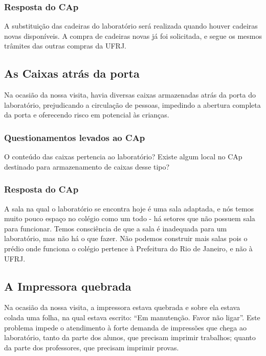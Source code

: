 \subsubsection{Resposta do CAp}

A substituição das cadeiras do laboratório será realizada quando houver cadeiras novas disponíveis. A compra de cadeiras novas já foi solicitada, e segue os mesmos trâmites das outras compras da UFRJ.

\subsection{As Caixas atrás da porta}\label{sec:LABEL_CHP_REL_SEC_PROBS_SUBSEC_CAIX}

Na ocasião da nossa visita, havia diversas caixas armazenadas atrás da porta do laboratório, prejudicando a circulação de pessoas, impedindo a abertura completa da porta e oferecendo risco em potencial às crianças.

\subsubsection{Questionamentos levados ao CAp}

O conteúdo das caixas pertencia ao laboratório? Existe algum local no CAp destinado para armazenamento de caixas desse tipo?

\subsubsection{Resposta do CAp}

A sala na qual o laboratório se encontra hoje é uma sala adaptada, e nós temos muito pouco espaço no colégio como um todo - há setores que não possuem sala para funcionar. Temos consciência de que a sala é inadequada para um laboratório, mas não há o que fazer. Não podemos construir mais salas pois o prédio onde funciona o colégio pertence à Prefeitura do Rio de Janeiro, e não à UFRJ.

\subsection{A Impressora quebrada}\label{sec:LABEL_CHP_REL_SEC_PROBS_SUBSEC_IMP}

Na ocasião da nossa visita, a impressora estava quebrada e sobre ela estava colada uma folha, na qual estava escrito: “Em manutenção. Favor não ligar”. Este problema impede o atendimento à forte demanda de impressões que chega ao laboratório, tanto da parte dos alunos, que precisam imprimir trabalhos; quanto da parte dos professores, que precisam imprimir provas.

